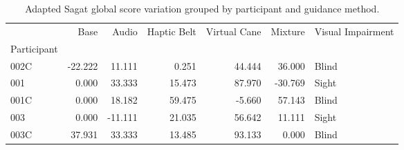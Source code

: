
\begin{table}[!htb]
\centering
\caption{Adapted Sagat global score variation grouped by participant and guidance method.}
\label{tab:sagat_var}
\begin{tabular}{lrrrrrl}
\toprule
{} &    Base &   Audio &  Haptic Belt &  Virtual Cane &  Mixture & Visual Impairment \\
Participant &         &         &              &               &          &                   \\
\midrule
002C        & -22.222 &  11.111 &        0.251 &        44.444 &   36.000 &             Blind \\
001         &   0.000 &  33.333 &       15.473 &        87.970 &  -30.769 &             Sight \\
001C        &   0.000 &  18.182 &       59.475 &        -5.660 &   57.143 &             Blind \\
003         &   0.000 & -11.111 &       21.035 &        56.642 &   11.111 &             Sight \\
003C        &  37.931 &  33.333 &       13.485 &        93.133 &    0.000 &             Blind \\
\bottomrule
\end{tabular}
\end{table}

